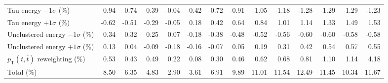\begin{table}[htbp]
{\begin{tabular}{lrrrrrrrrrrrrr}
Tau energy $-1\sigma$ (\%) & 0.94 & 0.74 & 0.39 & -0.04 & -0.42 & -0.72 & -0.91 & -1.05 & -1.18 & -1.28 & -1.29 & -1.29 & -1.23 \\ 
Tau energy $+1\sigma$ (\%) & -0.62 & -0.51 & -0.29 & -0.05 & 0.18 & 0.42 & 0.64 & 0.84 & 1.01 & 1.14 & 1.33 & 1.49 & 1.53 \\ 
Unclustered energy $-1\sigma$ (\%) & 0.34 & 0.32 & 0.25 & 0.07 & -0.18 & -0.38 & -0.48 & -0.52 & -0.56 & -0.60 & -0.60 & -0.58 & -0.58 \\ 
Unclustered energy $+1\sigma$ (\%) & 0.13 & 0.04 & -0.09 & -0.18 & -0.16 & -0.07 & 0.05 & 0.19 & 0.31 & 0.42 & 0.54 & 0.57 & 0.55 \\ 
$p_\mathrm{T}(t,\bar{t})$ reweighting (\%) & 0.53 & 0.43 & 0.49 & 0.22 & 0.08 & 0.30 & 0.46 & 0.62 & 0.68 & 0.81 & 1.10 & 1.14 & 4.18 \\ 
\hline 
Total (\%) & 8.50  & 6.35  & 4.83  & 2.90  & 3.61  & 6.91  & 9.89  & 11.01  & 11.54  & 12.49  & 11.45  & 10.34  & 11.67 \\ 
\hline 
\end{tabular}
}
\end{table}
